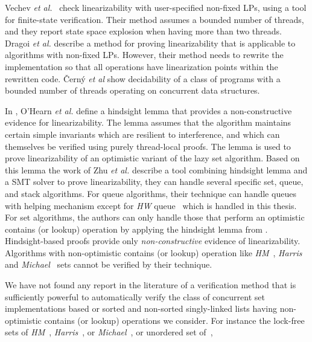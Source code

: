 %
Vechev {\it et al.}~\cite{Vechev:spin09}
check linearizability with user-specified non-fixed LPs,
using a tool for finite-state verification.
Their method assumes a bounded number of threads, and
they report state space explosion when having more than two threads.
%
Dragoi  {\it et al.} \cite{Henzinger:CAV13} describe a method for proving
linearizability that is applicable to algorithms with non-fixed LPs.
%
However, their method needs to rewrite the implementation so that all operations 
have linearization points within the rewritten code.
%
\v{C}ern{\'y} {\it et al} \cite{CernyRZCA:CAV10} show decidability of a class
of programs with a bounded number of threads operating on concurrent data structures.

In \cite{OHearnlist}, O'Hearn {\it et al.}  define a hindsight lemma that provides a non-constructive evidence for linearizability. The lemma assumes that the algorithm maintains certain simple invariants which are resilient to interference, and which
can themselves be verified using purely thread-local proofs.
The lemma is used to prove linearizability of an optimistic variant of 
the lazy set algorithm. Based on this lemma the work of Zhu {\it et al.} \cite{Poling}
describe a tool combining hindsight lemma and a SMT solver to prove linearizability, they can handle several specific set, queue, and stack  
algorithms. For queue algorithms, their technique can handle queues with helping mechanism except for {\it HW} queue~\cite{HeWi:linearizability} which is handled in this thesis.
%
For set algorithms, the authors can only handle those that perform an optimistic contains (or lookup) operation by applying the hindsight lemma from 
\cite{OHearnlist}. 
%
Hindsight-based proofs provide only {\it non-constructive} 
evidence of linearizability. Algorithms with non-optimistic contains (or lookup) operation like {\it HM}~\cite{ArtOfMpP}, {\it Harris}~\cite{Harris:list} and {\it Michael}~\cite{Michael:list} sets cannot be verified by their technique.


We have not found any report in the literature of a
verification method that is sufficiently powerful to
automatically verify the class of concurrent set
implementations based or sorted and non-sorted
singly-linked lists having non-optimistic contains (or lookup) operations we consider. For instance %
the lock-free sets of {\it HM}~\cite{ArtOfMpP},
{\it Harris}~\cite{Harris:list}, or {\it Michael}~\cite{Michael:list},
or unordered set of~\cite{Zhang:unorderedlist},


